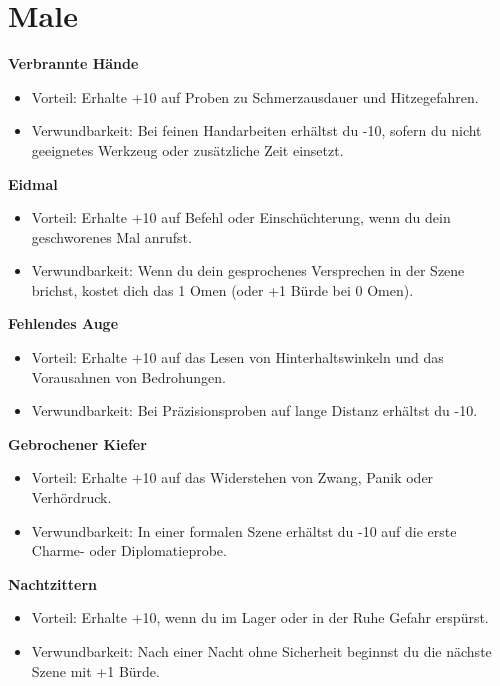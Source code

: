 \section{Male}\label{sec:male}
\noindent\textbf{Verbrannte Hände}\par
\begin{itemize}[leftmargin=*,nosep]
\item Vorteil: Erhalte +10 auf Proben zu Schmerzausdauer und Hitzegefahren.
\item Verwundbarkeit: Bei feinen Handarbeiten erhältst du -10, sofern du nicht geeignetes Werkzeug oder zusätzliche Zeit einsetzt.
\end{itemize}
\noindent\textbf{Eidmal}\par
\begin{itemize}[leftmargin=*,nosep]
\item Vorteil: Erhalte +10 auf Befehl oder Einschüchterung, wenn du dein geschworenes Mal anrufst.
\item Verwundbarkeit: Wenn du dein gesprochenes Versprechen in der Szene brichst, kostet dich das 1 Omen (oder +1 Bürde bei 0 Omen).
\end{itemize}
\noindent\textbf{Fehlendes Auge}\par
\begin{itemize}[leftmargin=*,nosep]
\item Vorteil: Erhalte +10 auf das Lesen von Hinterhaltswinkeln und das Vorausahnen von Bedrohungen.
\item Verwundbarkeit: Bei Präzisionsproben auf lange Distanz erhältst du -10.
\end{itemize}
\noindent\textbf{Gebrochener Kiefer}\par
\begin{itemize}[leftmargin=*,nosep]
\item Vorteil: Erhalte +10 auf das Widerstehen von Zwang, Panik oder Verhördruck.
\item Verwundbarkeit: In einer formalen Szene erhältst du -10 auf die erste Charme- oder Diplomatieprobe.
\end{itemize}
\noindent\textbf{Nachtzittern}\par
\begin{itemize}[leftmargin=*,nosep]
\item Vorteil: Erhalte +10, wenn du im Lager oder in der Ruhe Gefahr erspürst.
\item Verwundbarkeit: Nach einer Nacht ohne Sicherheit beginnst du die nächste Szene mit +1 Bürde.
\end{itemize}
